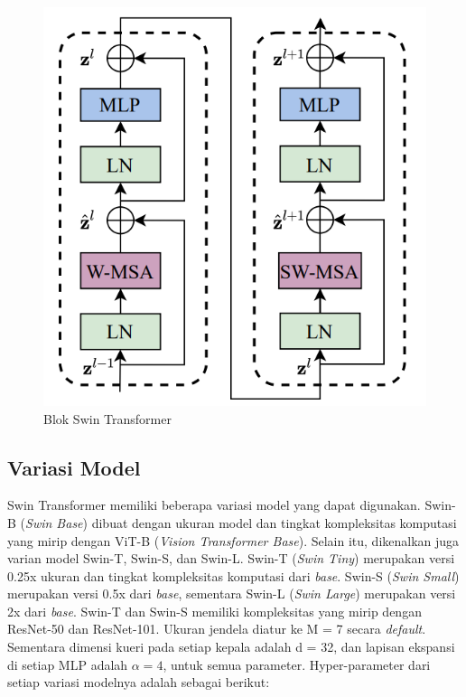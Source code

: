 \begin{figure}[h!]
  \centering
  \includegraphics[scale=0.6]{gambar/Blok Swin.png}
  \caption{Blok Swin Transformer}
  \label{fig:blokswintransformer}
\end{figure}

\subsection{Variasi Model}

Swin Transformer memiliki beberapa variasi model yang dapat digunakan. Swin-B (\emph{Swin Base}) dibuat dengan ukuran model dan tingkat kompleksitas komputasi yang mirip dengan ViT-B 
(\emph{Vision Transformer Base}). Selain itu, dikenalkan juga varian model Swin-T, Swin-S, dan Swin-L. Swin-T (\emph{Swin Tiny}) merupakan versi 0.25x ukuran dan tingkat kompleksitas 
komputasi dari \emph{base}. Swin-S (\emph{Swin Small}) merupakan versi 0.5x dari \emph{base}, sementara Swin-L (\emph{Swin Large}) merupakan versi 2x dari \emph{base}. Swin-T dan Swin-S 
memiliki kompleksitas yang mirip dengan ResNet-50 dan ResNet-101. Ukuran jendela diatur ke M = 7 secara \emph{default}. Sementara dimensi kueri pada setiap kepala adalah d = 32, dan lapisan 
ekspansi di setiap MLP adalah \begin{math}\alpha = 4\end{math}, untuk semua parameter. Hyper-parameter dari setiap variasi modelnya adalah sebagai berikut:

